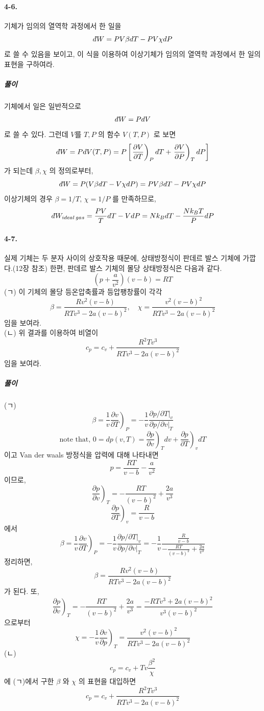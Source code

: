 \documentclass[a4paper,12pt]{report}
\newcommand{\Maxwell}[3][]{\left.\frac{\partial #2}{\partial #3} \right)_{#1} }
\newcommand{\dbar}{d\hspace*{-0.08em}\bar{}\hspace*{0.1em}}
\begin{document}
	\paragraph{4-6. } 기체가 임의의 열역학 과정에서 한 일을
	 $$\dbar W=PV\beta dT-PV\chi dP$$
	 로 쓸 수 있음을 보이고, 이 식을 이용하여 이상기체가 임의의 열역학 과정에서 한 일의 표현을 구하여라.
	 \subparagraph{풀이} 기체에서 일은 일반적으로 
	 $$\dbar W=PdV$$ 로 쓸 수 있다. 그런데 $V$를 $T,P$ 의 함수 $V(T,P)$ 로 보면
	 $$\dbar W=PdV(T,P)=P\left[\Maxwell[P]{V}{T}dT+\Maxwell[T]{V}{P}dP \right] $$
	 가 되는데 $\beta, \chi$ 의 정의로부터,
	 $$\dbar W=P(V\beta dT-V\chi dP)=PV\beta dT-PV\chi dP$$
	 이상기체의 경우 $\beta=1/T,\,\chi=1/P$ 를 만족하므로,
	 $$\dbar W_{ideal \,gas}=\frac{PV}{T} dT-VdP=Nk_BdT-\frac{Nk_BT}{P}dP$$
	 \paragraph{4-7. }실제 기체는 두 분자 사이의 상호작용 때문에, 상태방정식이 판데르 발스 기체에 가깝다.(12장 참조) 한편, 판데르 발스 기체의 몰당 상태방정식은 다음과 같다. 
	 $$\left(p+\frac{a}{v^2} \right) \left(v-b \right)=RT $$
	 (ㄱ) 이 기체의 몰당 등온압축률과 등압팽창률이 각각
	 $$\beta=\frac{Rv^2(v-b)}{RTv^3-2a(v-b)^2},\quad \chi=\frac{v^2(v-b)^2}{RTv^3-2a(v-b)^2}$$임을 보여라.\\
	(ㄴ) 위 결과를 이용하여 비열이 
	$$c_p=c_v+\frac{R^2Tv^3}{RTv^3-2a(v-b)^2}$$ 임을 보여라.
	\subparagraph{풀이} (ㄱ) 
	$$\beta=\frac{1}{v}\Maxwell[P]{v}{T}=-\frac{1}{v}\frac{\partial p/\partial T|_v}{\partial p/\partial v|_T}$$
	$$\mbox{note that,  } 0=dp(v,T)=\Maxwell[T]{p}{v}dv+\Maxwell[v]{p}{T}dT$$
	이고 Van der waals 방정식을 압력에 대해 나타내면
	$$p=\frac{RT}{v-b}-\frac{a}{v^2}$$
	이므로, 
	$$\Maxwell[T]{p}{v}=-\frac{RT}{(v-b)^2}+\frac{2a}{v^3}$$
	$$\Maxwell[v]{p}{T}=\frac{R}{v-b}$$ 에서 
	$$\beta=\frac{1}{v}\Maxwell[P]{v}{T}=-\frac{1}{v}\frac{\partial p/\partial T|_v}{\partial p/\partial v|_T}=-\frac{1}{v}\frac{\frac{R}{v-b}}{-\frac{RT}{(v-b)^2}+\frac{2a}{v^3}}$$
	정리하면, 
	$$\beta=\frac{Rv^2(v-b)}{RTv^3-2a(v-b)^2}$$
	가 된다. 또,
	 $$\Maxwell[T]{p}{v}=-\frac{RT}{(v-b)^2}+\frac{2a}{v^3}=\frac{-RTv^3+2a(v-b)^2}{v^3(v-b)^2}$$ 으로부터
	 $$\chi=-\frac{1}{v}\Maxwell[T]{v}{p}=\frac{v^2(v-b)^2}{RTv^3-2a(v-b)^2}$$
	 (ㄴ)
	 $$c_p=c_v+Tv\frac{\beta^2}{\chi}$$ 에 (ㄱ)에서 구한 $\beta$ 와 $\chi$ 의 표현을 대입하면
	 $$c_p=c_v+\frac{R^2Tv^3}{RTv^3-2a(v-b)^2}$$
\end{document}
